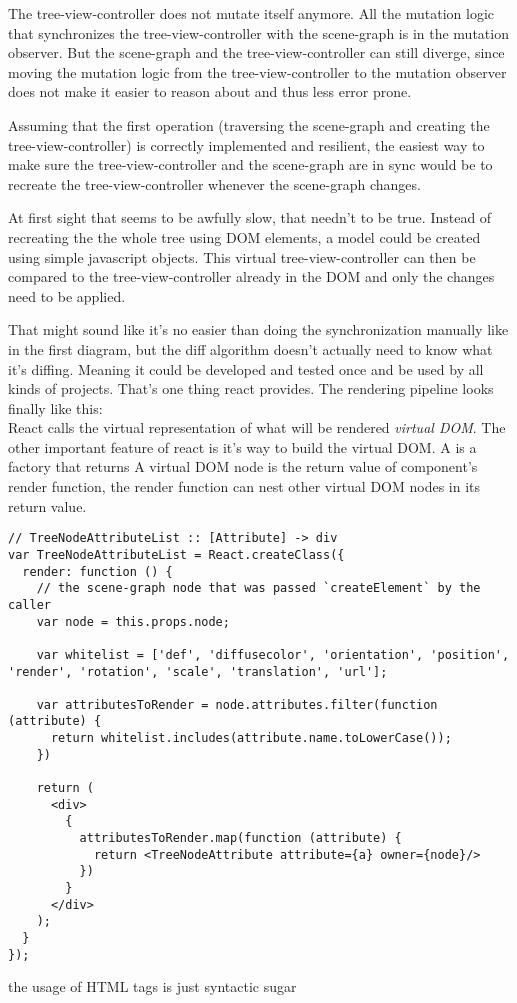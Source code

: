 The tree-view-controller does not mutate itself anymore. All the
mutation logic that synchronizes the tree-view-controller with the
scene-graph is in the mutation observer. But the scene-graph and the
tree-view-controller can still diverge, since moving the mutation logic
from the tree-view-controller to the mutation observer does not make it
easier to reason about and thus less error prone.

Assuming that the first operation (traversing the scene-graph and
creating the tree-view-controller) is correctly implemented and
resilient, the easiest way to make sure the tree-view-controller and the
scene-graph are in sync would be to recreate the tree-view-controller
whenever the scene-graph changes.

At first sight that seems to be awfully slow, that needn't to be true.
Instead of recreating the the whole tree using DOM elements, a
model could be created using simple javascript objects. This virtual
tree-view-controller can then be compared to the tree-view-controller
already in the DOM and only the changes need to be applied.

That might sound like it's no easier than doing the synchronization
manually like in the first diagram, but the diff algorithm doesn't
actually need to know what it's diffing. Meaning it could be developed
and tested once and be used by all kinds of projects. That's one thing
react provides. The rendering pipeline looks finally like this:\\

React calls the virtual representation of what will be rendered
\emph{virtual DOM}. The other important feature of react is it's way to
build the virtual DOM. A is a factory that returns A virtual DOM node is
the return value of component's render function, the render function can
nest other virtual DOM nodes in its return value.

\begin{listing}
  \begin{verbatim}
// TreeNodeAttributeList :: [Attribute] -> div
var TreeNodeAttributeList = React.createClass({
  render: function () {
    // the scene-graph node that was passed `createElement` by the caller
    var node = this.props.node;

    var whitelist = ['def', 'diffusecolor', 'orientation', 'position', 'render', 'rotation', 'scale', 'translation', 'url'];

    var attributesToRender = node.attributes.filter(function (attribute) {
      return whitelist.includes(attribute.name.toLowerCase());
    })

    return (
      <div>
        {
          attributesToRender.map(function (attribute) {
            return <TreeNodeAttribute attribute={a} owner={node}/>
          })
        }
      </div>
    );
  }
});
  \end{verbatim}
  \caption{the usage of HTML tags is just syntactic sugar}
  \label{list:treenodeattributeslist}
\end{listing}


